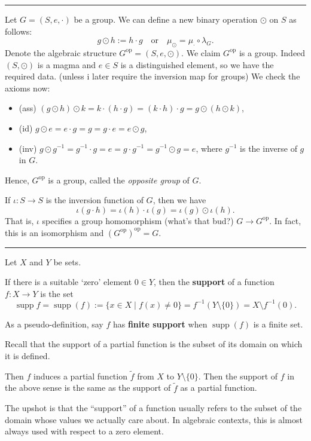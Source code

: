 \documentclass[12pt]{article}
\newcommand{\keyword}[1]{\textbf{#1}}
\newcommand{\sepline}{\rule{\textwidth}{0.4pt}}
\theoremstyle{definition}
\newcommand{\isp}[1]{\quad\text{#1}\quad}
\newcommand{\<}{\left\langle}
\renewcommand{\>}{\right\rangle}
\newcommand{\op}{\mathrm{op}}
\DeclareMathOperator{\supp}{supp}
\renewcommand{\_}[1]{{_{#1}}}
\begin{document}
\sepline

Let $G = (S, e, \cdot)$ be a group.
We can define a new binary operation $\odot$ on $S$ as follows:
\[
    g \odot h := h \cdot g \isp{or} \mu_\odot = \mu_\cdot \circ \lambda_G.
\]
Denote the algebraic structure $G^\op = (S, e, \odot)$.
We claim $G^\op$ is a group.
Indeed $(S, \odot)$ is a magma and $e \in S$ is a distinguished element, so we have the required data. (unless i later require the inversion map for groups)
We check the axioms now:
\begin{itemize}[nosep]
    \item (ass) $(g \odot h) \odot k = k \cdot (h \cdot g) = (k \cdot h) \cdot g = g \odot (h \odot k)$,
    \item (id) $g \odot e = e \cdot g = g = g \cdot e = e \odot g$,
    \item (inv) $g \odot g^{-1} = g^{-1} \cdot g = e = g \cdot g^{-1} = g^{-1} \odot g = e$, where $g^{-1}$ is the inverse of $g$ in $G$. 
\end{itemize}
Hence, $G^\op$ is a group, called the \emph{opposite group} of $G$.

If $\iota : S \to S$ is the inversion function of $G$, then we have
\[
    \iota(g \cdot h) = \iota(h) \cdot \iota(g) = \iota(g) \odot \iota(h).
\]
That is, $\iota$ specifies a group homomorphism (what's that bud?) $G \to G^\op$.
In fact, this is an isomorphism and $(G^\op)^\op = G$.


\sepline

Let $X$ and $Y$ be sets.

If there is a suitable `zero' element $0 \in Y$, then the \keyword{support} of a function $f : X \to Y$ is the set
\[
    \operatorname{supp} f
        = \operatorname{supp}(f)
        := \{x \in X \mid f(x) \ne 0\}
        = f^{-1}(Y \setminus \{0\})
        = X \setminus f^{-1}(0).
\]

As a pseudo-definition, say $f$ has \keyword{finite support} when $\supp(f)$ is a finite set.

Recall that the support of a partial function is the subset of its domain on which it is defined.

Then $f$ induces a partial function $\tilde{f}$ from $X$ to $Y \setminus \{0\}$.
Then the support of $f$ in the above sense is the same as the support of $\tilde{f}$ as a partial function.

The upshot is that the ``support'' of a function usually refers to the subset of the domain whose values we actually care about.
In algebraic contexts, this is almost always used with respect to a zero element.
\end{document}
